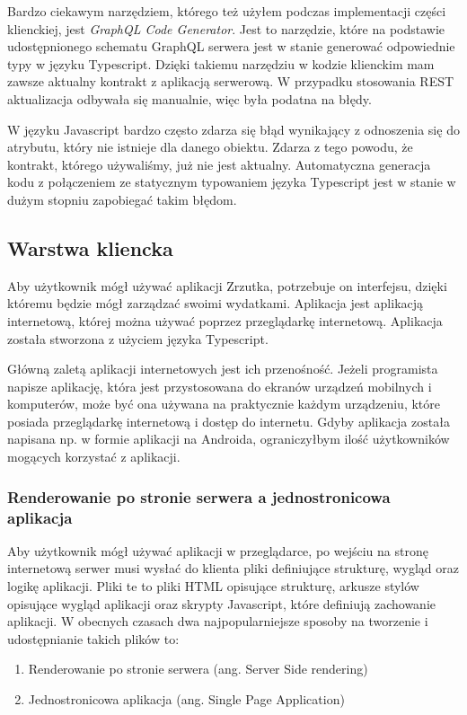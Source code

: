 Bardzo ciekawym narzędziem, którego też użyłem podczas implementacji części klienckiej, jest \emph{GraphQL Code Generator}. Jest to narzędzie, które na podstawie udostępnionego schematu GraphQL serwera jest w stanie generować odpowiednie typy w języku Typescript. Dzięki takiemu narzędziu w kodzie klienckim mam zawsze aktualny kontrakt z aplikacją serwerową. W przypadku stosowania REST aktualizacja odbywała się manualnie, więc była podatna na błędy.

W języku Javascript bardzo często zdarza się błąd wynikający z odnoszenia się do atrybutu, który nie istnieje dla danego obiektu. Zdarza z tego powodu, że kontrakt, którego używaliśmy, już nie jest aktualny. Automatyczna generacja kodu z połączeniem ze statycznym typowaniem języka Typescript jest w stanie w dużym stopniu zapobiegać takim błędom.

\subsection{Warstwa kliencka}
Aby użytkownik mógł używać aplikacji Zrzutka, potrzebuje on interfejsu, dzięki któremu będzie mógł zarządzać swoimi wydatkami. Aplikacja jest aplikacją internetową, której można używać poprzez przeglądarkę internetową. Aplikacja została stworzona z użyciem języka Typescript.

Główną zaletą aplikacji internetowych jest ich przenośność. Jeżeli programista napisze aplikację, która jest przystosowana do ekranów urządzeń mobilnych i komputerów, może być ona używana na praktycznie każdym urządzeniu, które posiada przeglądarkę internetową i dostęp do internetu. Gdyby aplikacja została napisana np. w formie aplikacji na Androida, ograniczyłbym ilość użytkowników mogących korzystać z aplikacji.
\subsubsection{Renderowanie po stronie serwera a jednostronicowa aplikacja}
Aby użytkownik mógł używać aplikacji w przeglądarce, po wejściu na stronę internetową serwer musi wysłać do klienta pliki definiujące strukturę, wygląd oraz logikę aplikacji. Pliki te to pliki HTML opisujące strukturę, arkusze stylów opisujące wygląd aplikacji oraz skrypty Javascript, które definiują zachowanie aplikacji.
W obecnych czasach dwa najpopularniejsze sposoby na tworzenie i udostępnianie takich plików to:
\begin{enumerate}
  \item Renderowanie po stronie serwera (ang. Server Side rendering)
  \item Jednostronicowa aplikacja (ang. Single Page Application)
\end{enumerate}

